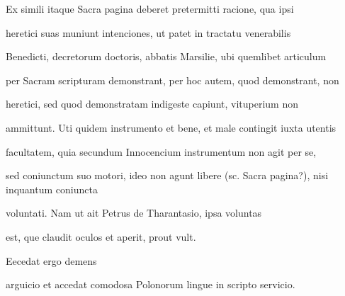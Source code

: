 Ex simili itaque Sacra pagina deberet pretermitti racione, qua ipsi

heretici suas muniunt intenciones, ut patet in tractatu venerabilis

Benedicti, decretorum doctoris, abbatis Marsilie, ubi quemlibet articulum

per Sacram scripturam demonstrant, per hoc autem, quod demonstrant, non 

 heretici, sed quod demonstratam indigeste capiunt, vituperium non

ammittunt. Uti quidem instrumento et bene, et male contingit iuxta utentis

facultatem, quia secundum Innocencium instrumentum non agit per se,

sed coniunctum suo motori, ideo non agunt libere (sc. Sacra pagina?), nisi inquantum coniuncta 

 voluntati. Nam ut ait Petrus de Tharantasio, ipsa voluntas

\splitlines{}

est, que claudit oculos et aperit, prout vult.

\indentK Eecedat ergo demens 



\fullpreviouslines


{
\color{blue}

arguicio et accedat comodosa Polonorum lingue in scripto servicio.

}


